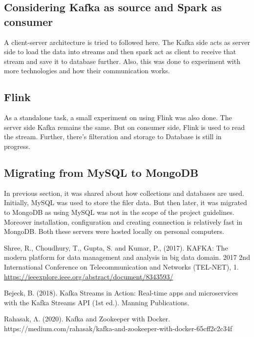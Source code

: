 \documentclass{article}
\begin{document}
\subsection{Considering Kafka as source and Spark as consumer}

A client-server architecture is tried to followed here. The Kafka side acts as server side to load the data into streams and then spark act as client to receive that stream and save it to database further. Also, this was done to experiment with  more technologies and how their communication works.

\subsection{Flink}

As a standalone task, a small experiment on using Flink was also done. The server side Kafka remains the same. But on consumer side, Flink is used to read the stream. Further, there's filteration and storage to Database is still in progress.

\subsection{Migrating from MySQL to MongoDB}

In previous section, it was shared about how collections and databases are used. Initially, MySQL was used to store the filer data. But then later, it was migrated to MongoDB as using MySQL was not in the scope of the project guidelines. Moreover installation, configuration and creating connection is relatively fast in MongoDB. Both these servers were hosted locally on personal computers.


\begin{thebibliography}{9}

Shree, R., Choudhury, T., Gupta, S. and Kumar, P., (2017). KAFKA: The modern platform for data management and analysis in big data domain. 2017 2nd International Conference on Telecommunication and Networks (TEL-NET), 1. \url{https://ieeexplore.ieee.org/abstract/document/8343593/}

Bejeck, B. (2018). Kafka Streams in Action: Real-time apps and microservices with the Kafka Streams API (1st ed.). Manning Publications.

Rahasak, Λ. (2020). Kafka and Zookeeper with Docker. https://medium.com/rahasak/kafka-and-zookeeper-with-docker-65cff2c2c34f

\end{thebibliography}
\end{document}
